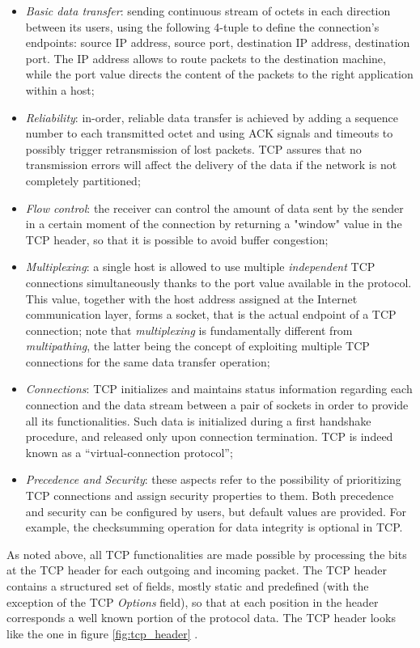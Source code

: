 \begin{itemize}
  \item \textit{Basic data transfer}: sending continuous stream of octets in each direction between its users, using the following 4-tuple to define the connection's endpoints: source IP address, source port, destination IP address, destination port. The IP address allows to route packets to the destination machine, while the port value directs the content of the packets to the right application within a host;
  \item \textit{Reliability}: in-order, reliable data transfer is achieved by adding a sequence number to each transmitted octet and using ACK signals and timeouts to possibly trigger retransmission of lost packets. TCP assures that no transmission errors will affect the delivery of the data if the network is not completely partitioned;
  \item \textit{Flow control}: the receiver can control the amount of data sent by the sender in a certain moment of the connection by returning a "window" value in the TCP header, so that it is possible to avoid buffer congestion;
  \item \textit{Multiplexing}: a single host is allowed to use multiple \textit{independent} TCP connections simultaneously thanks to the port value available in the protocol. This value, together with the host address assigned at the Internet communication layer, forms a socket, that is the actual endpoint of a TCP connection; note that \textit{multiplexing} is fundamentally different from \textit{multipathing}, the latter being the concept of exploiting multiple TCP connections for the same data transfer operation;
  \item \textit{Connections}: TCP initializes and maintains status information regarding each connection and the data stream between a pair of sockets in order to provide all its functionalities. Such data is initialized during a first handshake procedure, and released only upon connection termination. TCP is indeed known as a ``virtual-connection protocol'';
  \item \textit{Precedence and Security}: these aspects refer to the possibility of prioritizing TCP connections and assign security properties to them. Both precedence and security can be configured by users, but default values are provided. For example, the checksumming operation for data integrity is optional in TCP.
\end{itemize}

As noted above, all TCP functionalities are made possible by processing the bits at the TCP header for each outgoing and incoming packet. The TCP header contains a structured set of fields, mostly static and predefined (with the exception of the TCP \textit{Options} field), so that at each position in the header corresponds a well known portion of the protocol data. The TCP header looks like the one in figure \ref{fig:tcp_header} \cite{rfc793}.

